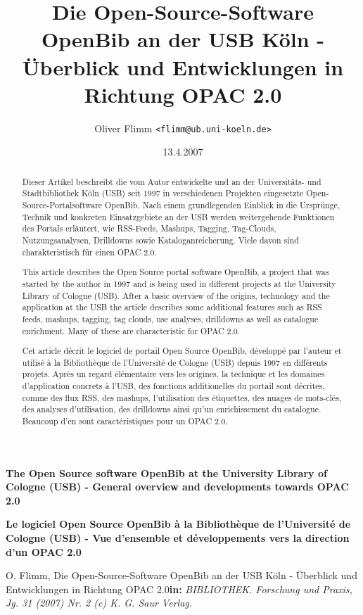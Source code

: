 \documentclass[11pt]{scrartcl}
\title{Die Open-Source-Software OpenBib an der USB Köln - Überblick und Entwicklungen in Richtung OPAC 2.0}
\author{Oliver Flimm \texttt{<flimm@ub.uni-koeln.de>}}
\date{13.4.2007}
\begin{document}
\begin{titlepage}
\maketitle
\thispagestyle{empty}

\begin{abstract}
  Dieser Artikel beschreibt die vom Autor entwickelte und an der
  Universitäts- und Stadtbibliothek Köln (USB) seit 1997 in
  verschiedenen Projekten eingesetzte Open-Source-Portalsoftware
  OpenBib. Nach einem grundlegenden Einblick in die Ursprünge, Technik
  und konkreten Einsatzgebiete an der USB werden weitergehende
  Funktionen des Portals erläutert, wie RSS-Feeds, Mashups, Tagging,
  Tag-Clouds, Nutzungsanalysen, Drilldowns sowie Kataloganreicherung.
  Viele davon sind charakteristisch für einen OPAC 2.0.
\end{abstract}

\textbf{\fontsize{12}{12pt}\selectfont The Open Source software OpenBib at the University Library of Cologne (USB) - General overview and developments towards OPAC 2.0}

\begin{abstract}
  This article describes the Open Source portal software OpenBib, a
  project that was started by the author in 1997 and is being used in
  different projects at the University Library of Cologne (USB). After
  a basic overview of the origins, technology and the application at
  the USB the article describes some additional features such as RSS
  feeds, mashups, tagging, tag clouds, use analyses, drilldowns as
  well as catalogue enrichment. Many of these are characteristic for
  OPAC 2.0.
\end{abstract}

\textbf{\fontsize{12}{12pt}\selectfont
  Le logiciel Open Source OpenBib à la Bibliothèque de l'Université de Cologne (USB) - Vue d'ensemble et développements vers la direction d'un OPAC 2.0}

\begin{abstract}
Cet article décrit le logiciel de portail Open Source OpenBib,
développé par l'auteur et utilisé à la Bibliothèque de l'Université de
Cologne (USB) depuis 1997 en différents projets. Après un regard
élémentaire vers les origines, la technique et les domaines
d'application concrets à l'USB, des fonctions additionelles du portail
sont décrites, comme des flux RSS, des mashups, l'utilisation des
étiquettes, des nuages de mots-clés, des analyses d'utilisation, des
drilldowns ainsi qu'un enrichissement du catalogue. Beaucoup d'en sont
caractéristi\-ques pour un OPAC 2.0.
\end{abstract}

\scriptsize O. Flimm, Die Open-Source-Software OpenBib an der USB Köln - Überblick und Entwicklungen in Richtung OPAC 2.0\newline \textbf{in:} \emph{BIBLIOTHEK. Forschung und Praxis, Jg. 31 (2007) Nr. 2 (c) K. G. Saur Verlag.}
\end{titlepage}
\end{document}
